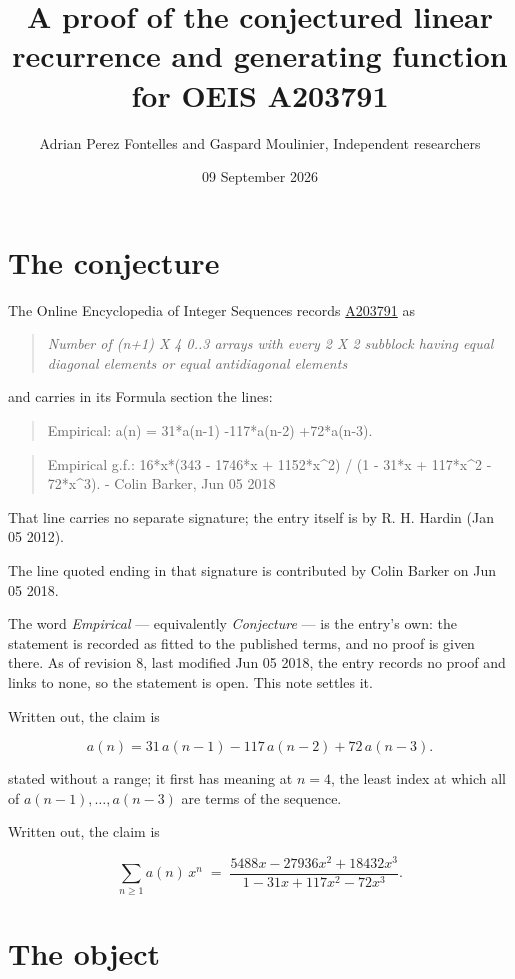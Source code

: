 \documentclass[11pt]{article}
\title{A proof of the conjectured linear recurrence and generating function for OEIS A203791}
\author{Adrian Perez Fontelles and Gaspard Moulinier, Independent researchers}
\date{09 September 2026}
\theoremstyle{definition}
\begin{document}
\maketitle
\section{The conjecture}

The Online Encyclopedia of Integer Sequences records \href{https://oeis.org/A203791}{A203791} as

\begin{quote}\itshape Number of (n+1) X 4 0..3 arrays with every 2 X 2 subblock having equal diagonal elements or equal antidiagonal elements\end{quote}

and carries in its Formula section the lines:

\begin{quote}\ttfamily Empirical: a(n) = 31*a(n-1) -117*a(n-2) +72*a(n-3).\end{quote}

\begin{quote}\ttfamily Empirical g.f.: 16*x*(343 - 1746*x + 1152*x\textasciicircum{}2) / (1 - 31*x + 117*x\textasciicircum{}2 - 72*x\textasciicircum{}3). - Colin Barker, Jun 05 2018\end{quote}

That line carries no separate signature; the entry itself is by R. H. Hardin (Jan 05 2012).

The line quoted ending in that signature is contributed by Colin Barker on Jun 05 2018.

The word {\itshape Empirical} --- equivalently {\itshape Conjecture} --- is the entry's own: the statement is recorded as fitted to the published terms, and no proof is given there. As of revision 8, last modified Jun 05 2018, the entry records no proof and links to none, so the statement is open. This note settles it.

Written out, the claim is

\[a(n) = 31\,a(n-1) - 117\,a(n-2) + 72\,a(n-3).\]

stated without a range; it first has meaning at $n = 4$, the least index at which all of $a(n-1),\dots,a(n-3)$ are terms of the sequence.

Written out, the claim is

\[\sum_{n \ge 1} a(n)\,x^n \;=\; \frac{5488x - 27936x^{2} + 18432x^{3}}{1 - 31x + 117x^{2} - 72x^{3}}.\]

\section{The object}
\end{document}
